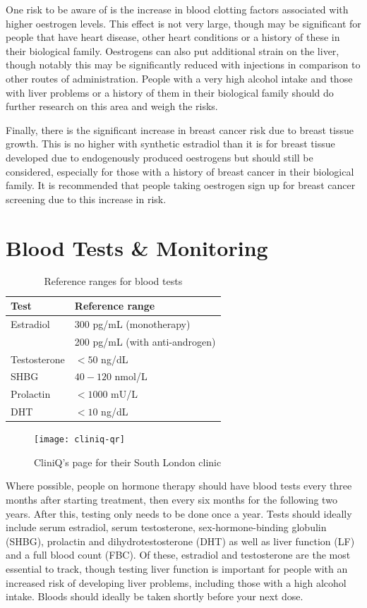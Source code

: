 \documentclass[twoside,a5paper]{article}
\begin{document}
One risk to be aware of is the increase in blood clotting factors
associated with higher oestrogen levels.  This effect is not very
large, though may be significant for people that have heart disease,
other heart conditions or a history of these in their biological
family.  Oestrogens can also put additional strain on the liver,
though notably this may be significantly reduced with injections in
comparison to other routes of administration.  People with a very high
alcohol intake and those with liver problems or a history of them in
their biological family should do further research on this area and
weigh the risks.

Finally, there is the significant increase in breast cancer risk due
to breast tissue growth.  This is no higher with synthetic estradiol
than it is for breast tissue developed due to endogenously produced
oestrogens but should still be considered, especially for those with a
history of breast cancer in their biological family.  It is
recommended that people taking oestrogen sign up for breast cancer
screening due to this increase in risk.

\section{Blood Tests \& Monitoring}

\begin{table}
  \centering
  \begin{tabular}{ll}
    \toprule
    Test & Reference range \\
    \midrule
    Estradiol & 300 pg/mL (monotherapy) \\
    & 200 pg/mL (with anti-androgen) \\
    Testosterone & $< 50$ ng/dL \\
    SHBG & $40 - 120$ nmol/L \\
    Prolactin & $< 1000$ mU/L \\
    DHT & $< 10$ ng/dL \\
    \bottomrule
  \end{tabular}
  \caption{Reference ranges for blood tests}
  \label{tab:blood-ranges}
\end{table}

\begin{figure}
  \centering
  \texttt{[image: cliniq-qr]}
  \caption{CliniQ's page for their South London clinic}
  \label{fig:cliniq-qr}
\end{figure}

Where possible, people on hormone therapy should have blood tests
every three months after starting treatment, then every six months for
the following two years.  After this, testing only needs to be done
once a year.  Tests should ideally include serum estradiol, serum
testosterone, sex-hormone-binding globulin (SHBG), prolactin and
dihydrotestosterone (DHT) as well as liver function (LF) and a full
blood count (FBC).  Of these, estradiol and testosterone are the most
essential to track, though testing liver function is important for
people with an increased risk of developing liver problems, including
those with a high alcohol intake.  Bloods should ideally be taken
shortly before your next dose.
\end{document}
